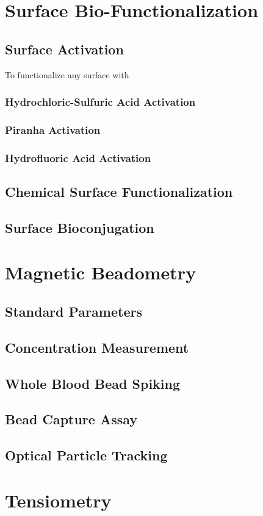 \section{Surface Bio-Functionalization}

\subsection{Surface Activation}
To functionalize any surface with 
\subsubsection{Hydrochloric-Sulfuric Acid Activation}


\subsubsection{Piranha Activation}

\subsubsection{Hydrofluoric Acid Activation}

\subsection{Chemical Surface Functionalization}

\subsection{Surface Bioconjugation}

\section{Magnetic Beadometry}

\subsection{Standard Parameters}

\subsection{Concentration Measurement}

\subsection{Whole Blood Bead Spiking}

\subsection{Bead Capture Assay}

\subsection{Optical Particle Tracking}

\section{Tensiometry}



